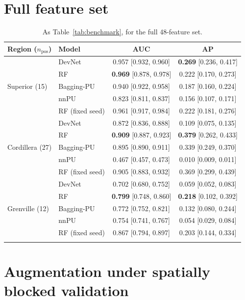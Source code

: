 \documentclass[pdflatex,sn-apa]{sn-jnl}
\begin{document}
\begin{appendices}

\section{Full feature set}\label{app:full}

\begin{table}[!h]
\caption{As Table~\ref{tab:benchmark}, for the full 48-feature set.}\label{tab:benchmark-full}
\footnotesize
\begin{tabular*}{\textwidth}{@{\extracolsep\fill}llcc}
\toprule
Region ($n_{\mathrm{pos}}$) & Model & AUC & AP \\
\midrule
\multirow{5}{*}{Superior (15)} & DevNet & 0.957 [0.932, 0.960] & \textbf{0.269} [0.236, 0.417] \\
 & RF & \textbf{0.969} [0.878, 0.978] & 0.222 [0.170, 0.273] \\
 & Bagging-PU & 0.940 [0.922, 0.958] & 0.187 [0.160, 0.224] \\
 & nnPU & 0.823 [0.811, 0.837] & 0.156 [0.107, 0.171] \\
 & RF (fixed seed) & 0.961 [0.917, 0.984] & 0.222 [0.181, 0.276] \\
\midrule
\multirow{5}{*}{Cordillera (27)} & DevNet & 0.872 [0.836, 0.888] & 0.109 [0.075, 0.135] \\
 & RF & \textbf{0.909} [0.887, 0.923] & \textbf{0.379} [0.262, 0.433] \\
 & Bagging-PU & 0.895 [0.890, 0.911] & 0.339 [0.249, 0.370] \\
 & nnPU & 0.467 [0.457, 0.473] & 0.010 [0.009, 0.011] \\
 & RF (fixed seed) & 0.905 [0.883, 0.932] & 0.369 [0.299, 0.439] \\
\midrule
\multirow{5}{*}{Grenville (12)} & DevNet & 0.702 [0.680, 0.752] & 0.059 [0.052, 0.083] \\
 & RF & \textbf{0.799} [0.748, 0.860] & \textbf{0.218} [0.102, 0.392] \\
 & Bagging-PU & 0.772 [0.752, 0.821] & 0.132 [0.080, 0.244] \\
 & nnPU & 0.754 [0.741, 0.767] & 0.054 [0.029, 0.084] \\
 & RF (fixed seed) & 0.867 [0.794, 0.897] & 0.203 [0.144, 0.334] \\
\botrule
\end{tabular*}
\end{table}

\section{Augmentation under spatially blocked validation}\label{app:aug-spatial}


\end{appendices}
\end{document}
